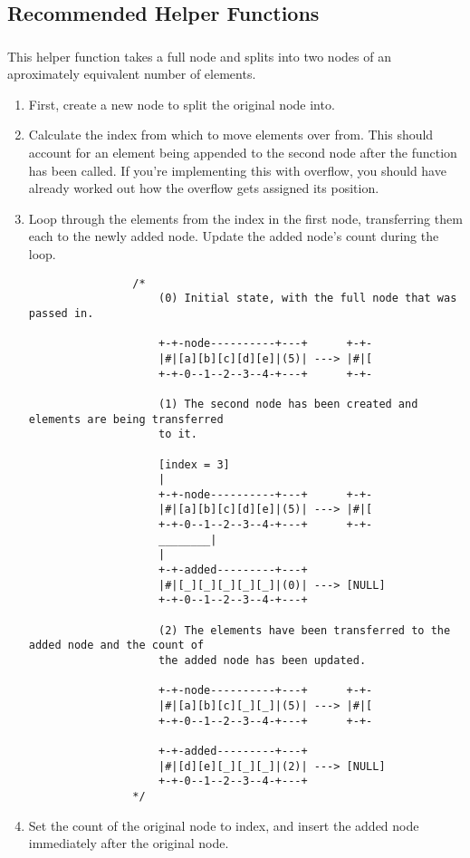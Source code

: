 \subsection{Recommended Helper Functions}
\label{section:rec_helper}


\subsubsection{}

This helper function takes a full node and splits into two nodes of an
aproximately equivalent number of elements.

\begin{enumerate}
	\item First, create a new node to split the original node into.

	\item Calculate the index from which to move elements over from. This should
	      account for an element being appended to the second node after the
	      function has been called. If you're implementing this with overflow,
	      you should have already worked out how the overflow gets assigned its
	      position.

	\item Loop through the elements from the index in the first node, transferring
	      them each to the newly added node. Update the added node's count during
	      the loop.

	      \begin{verbatim}
				/*
					(0) Initial state, with the full node that was passed in.

					+-+-node----------+---+      +-+-
					|#|[a][b][c][d][e]|(5)| ---> |#|[
					+-+-0--1--2--3--4-+---+      +-+-

					(1) The second node has been created and elements are being transferred
					to it.

					[index = 3]
					|
					+-+-node----------+---+      +-+-
					|#|[a][b][c][d][e]|(5)| ---> |#|[
					+-+-0--1--2--3--4-+---+      +-+-
					________|
					|
					+-+-added---------+---+
					|#|[_][_][_][_][_]|(0)| ---> [NULL]
					+-+-0--1--2--3--4-+---+

					(2) The elements have been transferred to the added node and the count of
					the added node has been updated.

					+-+-node----------+---+      +-+-
					|#|[a][b][c][_][_]|(5)| ---> |#|[
					+-+-0--1--2--3--4-+---+      +-+-

					+-+-added---------+---+
					|#|[d][e][_][_][_]|(2)| ---> [NULL]
					+-+-0--1--2--3--4-+---+
				*/
		\end{verbatim}

	\item Set the count of the original node to index, and insert the added node
	      immediately after the original node.
\end{enumerate}



